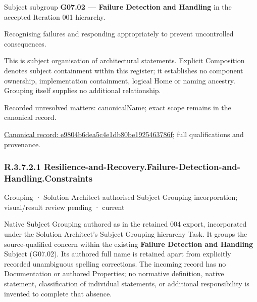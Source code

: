 Subject subgroup \textbf{G07.02 — Failure Detection and Handling} in the accepted Iteration 001 hierarchy.



Recognising failures and responding appropriately to prevent uncontrolled consequences.



This is subject organisation of architectural statements. Explicit Composition denotes subject containment within this register; it establishes no component ownership, implementation containment, logical Home or naming ancestry. Grouping itself supplies no additional relationship.


{\small Recorded unresolved matters: canonicalName; exact scope remains in the canonical record.}\par
{\footnotesize \href{../../../../continuum/grouping/e9804b6dea5c4e1db80be1925463786f.md}{Canonical record: e9804b6dea5c4e1db80be1925463786f}; full qualifications and provenance.}\par
\subsubsection*{R.3.7.2.1 Resilience-and-Recovery.Failure-Detection-and-Handling.Constraints}
\label{navigation:R.3.7.2.1}

\label{element:ee9bc6c96d944f2ea8bbaaeffb31db28}
{\small Grouping · Solution Architect authorised Subject Grouping incorporation; visual/result review pending · current}\par

Native Subject Grouping authored as \texttt{} in the retained 004 export,
incorporated under the Solution Architect's Subject Grouping hierarchy Task.
It groups the source-qualified \texttt{} concern within
the existing \textbf{Failure Detection and Handling} Subject (G07.02). Its authored full name
is retained apart from explicitly recorded unambiguous spelling corrections.
The incoming record has no Documentation or authored Properties; no normative
definition, native statement, classification of individual statements, or
additional responsibility is invented to complete that absence.



